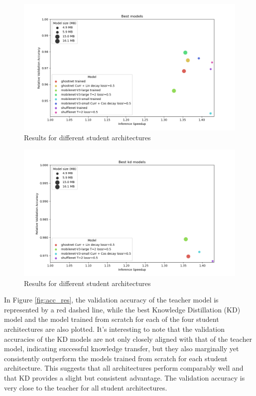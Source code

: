 \documentclass{article}
\begin{document}
\begin{figure}
	\centering
	\includegraphics[width=\linewidth]{assets/fat_plot_best}
	\caption{Results for different student architectures}
	\label{fig:scatter_res}
\end{figure}

\begin{figure}
	\centering
	\includegraphics[width=\linewidth]{assets/fat_plot_best KD}
	\caption{Results for different student architectures}
	\label{fig:scatter_kd_res}
\end{figure}


In Figure \ref{fig:acc_res}, the validation accuracy of the teacher model is represented by a red dashed line, while the best Knowledge Distillation (KD) model and the model trained from scratch for each of the four student architectures are also plotted. It's interesting to note that the validation accuracies of the KD models are not only closely aligned with that of the teacher model, indicating successful knowledge transfer, but they also marginally yet consistently outperform the models trained from scratch for each student architecture. This suggests that all architectures perform comparably well and that KD provides a slight but consistent advantage. The validation accuracy is very close to the teacher for all student architectures.
\end{document}

